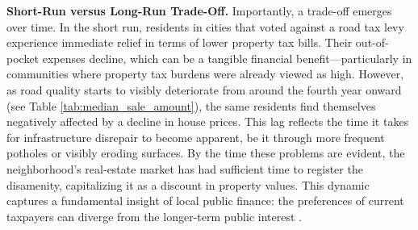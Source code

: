 {\bf Short-Run versus Long-Run Trade-Off.} Importantly, a trade-off emerges over time. In the short run, residents in cities that voted against a road tax levy experience immediate relief in terms of lower property tax bills. Their out-of-pocket expenses decline, which can be a tangible financial benefit—particularly in communities where property tax burdens were already viewed as high. However, as road quality starts to visibly deteriorate from around the fourth year onward (see Table \ref{tab:median_sale_amount}), the same residents find themselves negatively affected by a decline in house prices. This lag reflects the time it takes for infrastructure disrepair to become apparent, be it through more frequent potholes or visibly eroding surfaces. By the time these problems are evident, the neighborhood’s real-estate market has had sufficient time to register the disamenity, capitalizing it as a discount in property values. This dynamic captures a fundamental insight of local public finance: the preferences of current taxpayers can diverge from the longer-term public interest \citep{BuchananTullock1962, AlesinaTabellini1990}. 




